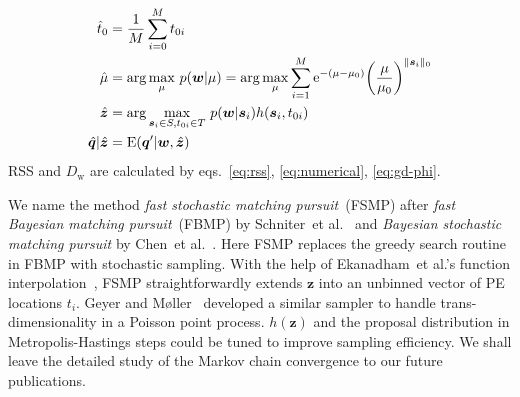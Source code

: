 \begin{equation}
  \label{eq:fsmpcharge}
  \begin{aligned}
    \hat{t}_0 &= \frac{1}{M}\sum_{i=0}^M t_{0i}\\
    \hat{\mu} &= \arg\underset{\mu}{\max}~p(\bm{w}|\mu) = \arg\underset{\mu}{\max} \sum_{i=1}^M \mathrm{e}^{-(\mu-\mu_0)}{\left(\frac{\mu}{\mu_0}  \right)}^{\Vert \bm{s}_i \Vert_0}\\
    \hat{\bm{z}} &= \arg \underset{\bm{s}_i \in S, t_{0i} \in T}{\max}~p(\bm{w}|\bm{s}_i) h(\bm{s}_i, t_{0i}) \\
    \hat{\bm{q}}|{\hat{\bm{z}}} &= \operatorname{E}(\bm{q}'|\bm{w},\hat{\bm{z}})
  \end{aligned}
\end{equation}
RSS and $D_\mathrm{w}$ are calculated by eqs.~\eqref{eq:rss}, \eqref{eq:numerical}, \eqref{eq:gd-phi}.

We name the method \emph{fast stochastic matching pursuit}~(FSMP) after \emph{fast Bayesian matching pursuit}~(FBMP) by Schniter~et al.~\cite{schniter_fast_2008} and \emph{Bayesian stochastic matching pursuit} by Chen~et al.~\cite{chen_stochastic_2011}.  Here FSMP replaces the greedy search routine in FBMP with stochastic sampling.  With the help of Ekanadham~et al.'s function interpolation~\cite{ekanadham_recovery_2011}, FSMP straightforwardly extends $\bm{z}$ into an unbinned vector of PE locations $t_i$.  Geyer and Møller~\cite{geyer_simulation_1994} developed a similar sampler to handle trans-dimensionality in a Poisson point process.  $h(\bm{z})$ and the proposal distribution in Metropolis-Hastings steps could be tuned to improve sampling efficiency.  We shall leave the detailed study of the Markov chain convergence to our future publications.

